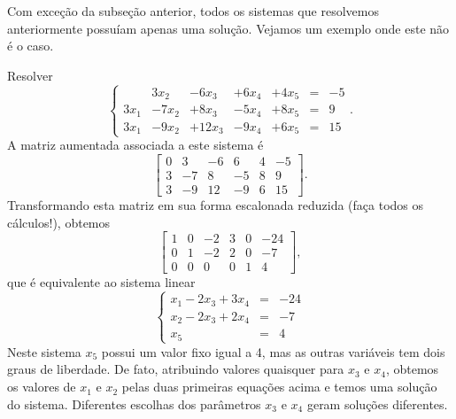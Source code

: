Com exceção da subseção anterior, todos os sistemas que resolvemos anteriormente possuíam apenas uma solução. Vejamos um exemplo onde este não é o caso.

\begin{ex}
Resolver
\begin{equation}
\left\{
  \begin{array}{rrrrrrl}
     & 3 x_2 & -6x_3 & + 6x_4 & + 4x_5 &=& -5\\
    3x_1 & -7x_2 & +8x_3 & -5 x_4 & + 8x_5 &=& 9\\
    3x_1 & -9x_2 & +12x_3 & -9x_4 & +6x_5 &=& 15
  \end{array}
\right. .
\end{equation} A matriz aumentada associada a este sistema é
\begin{equation}
\left[
  \begin{array}{ccccc|c}
    0 &  3 & -6 &  6 & 4 & -5 \\
    3 & -7 &  8 & -5 & 8 &  9 \\
    3 & -9 & 12 & -9 & 6 & 15
  \end{array}
\right] .
\end{equation} Transformando esta matriz em sua forma escalonada reduzida (faça todos os cálculos!), obtemos
\begin{equation}
\left[
  \begin{array}{ccccc|c}
    1 & 0 & -2 & 3 & 0 & -24 \\
    0 & 1 & -2 & 2 & 0 &  -7 \\
    0 & 0 &  0 & 0 & 1 &   4
  \end{array}
\right],
\end{equation} que é equivalente ao sistema linear
\begin{equation}
\left\{
  \begin{array}{rcl}
      x_1 - 2 x_3 + 3 x_4 &=& -24\\
      x_2 - 2 x_3 + 2 x_4  &=& -7\\
      x_5 &=& 4
  \end{array}
\right.
\end{equation} Neste sistema $x_5$ possui um valor fixo igual a 4, mas as outras variáveis tem dois graus de liberdade. De fato, atribuindo valores quaisquer para $x_3$ e $x_4$, obtemos os valores de $x_1$ e $x_2$ pelas duas primeiras equações acima e temos uma solução do sistema. Diferentes escolhas dos parâmetros $x_3$ e $x_4$ geram soluções diferentes.


\end{ex}
